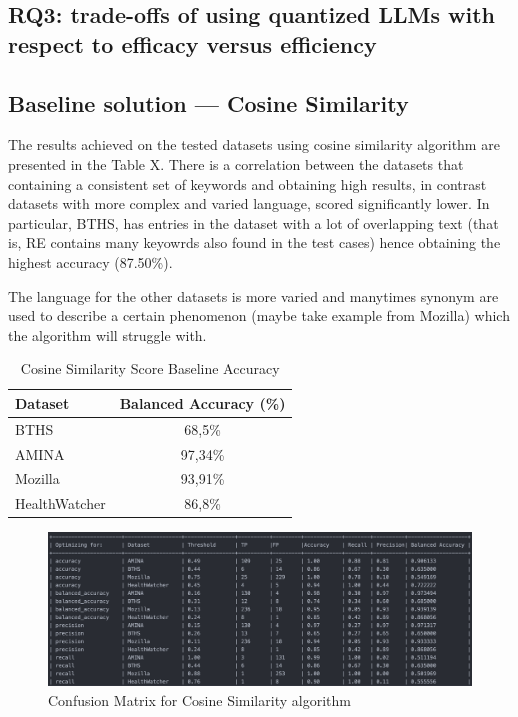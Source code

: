\documentclass[conference]{IEEEtran}
\begin{document}
\subsection{\textbf{RQ3:} trade-offs of using quantized LLMs with respect to efficacy versus efficiency}

\subsection{Baseline solution --- Cosine Similarity}

The results achieved on the tested datasets using cosine similarity algorithm are presented in the Table X. There is a correlation between the datasets that containing a consistent set of keywords and obtaining high results, in contrast datasets with more complex and varied language, scored significantly lower. In particular, BTHS, has entries in the dataset with a lot of overlapping text (that is, RE contains many keyowrds also found in the test cases) hence obtaining the highest accuracy (87.50\%). 

The language for the other datasets is more varied and manytimes synonym are used to describe a certain phenomenon (maybe take example from Mozilla) which the algorithm will struggle with.

\begin{table}[h]
    \centering
    \caption{Cosine Similarity Score Baseline Accuracy\label{tab:cosine_baseline_accuracy}}
    \renewcommand{\arraystretch}{1.2}
    \begin{tabular}{||l|c||}
    \hline
    \textbf{Dataset} & \textbf{Balanced Accuracy (\%)} \\
    \hline
    BTHS & 68,5\% \\
    AMINA & 97,34\% \\
    Mozilla & 93,91\% \\
    HealthWatcher & 86,8\% \\
    \hline
    \end{tabular}
\end{table}


\begin{figure}[H]
    \centering
    \includegraphics[width=0.99\columnwidth]{images/cosine_confusion_matrix.png}
    \caption{Confusion Matrix for Cosine Similarity algorithm}
    \label{fig:confution_cosine}
\end{figure}
\end{document}
